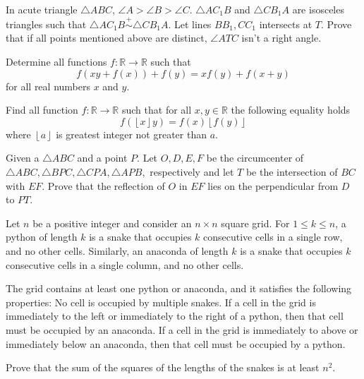 \documentclass[11pt]{scrartcl}
\begin{document}
\begin{problem}[8534263250311217423]
	In acute triangle $\triangle {ABC}$, $\angle 
A > \angle B > \angle C$. $\triangle {AC_1B}$ and $\triangle {CB_1A}$ are isosceles triangles such that $\triangle {AC_1B} \stackrel{+}{\sim}  \triangle {CB_1A}$. Let lines $BB_1, CC_1$ intersects at ${T}$. Prove that if all points mentioned above are distinct, $\angle ATC$ isn't a right angle.
\end{problem}
\begin{problem}[8540244741312291150]
Determine all functions $f:\mathbb{R} \to \mathbb{R}$ such that
\[ f(xy+f(x)) + f(y) = xf(y) + f(x+y) \]for all real numbers $x$ and $y$.
\end{problem}
\begin{problem}[8559783288978563338]
Find all function $f:\mathbb{R}\rightarrow\mathbb{R}$ such that for all $x,y\in\mathbb{R}$ the following equality holds\[
f(\left\lfloor x\right\rfloor y)=f(x)\left\lfloor f(y)\right\rfloor \]where $\left\lfloor a\right\rfloor $ is greatest integer not greater than $a.$
\end{problem}
\begin{problem}[8569243655022492300]
	Given a $ \triangle ABC $ and a point $ P. $ Let $ O, D, E, F $ be the circumcenter of $ \triangle ABC, \triangle BPC, \triangle CPA, \triangle APB, $ respectively and let $ T $ be the intersection of $ BC $ with $ EF. $ Prove that the reflection of $ O $ in $ EF $ lies on the perpendicular from $ D $ to $ PT. $
\end{problem}
\begin{problem}[8592236630142322398]
	Let \(n\) be a positive integer and consider an \(n\times n\) square grid. For \(1\le k\le n\), a python of length \(k\) is a snake that occupies \(k\) consecutive cells in a single row, and no other cells. Similarly, an anaconda of length \(k\) is a snake that occupies \(k\) consecutive cells in a single column, and no other cells.

The grid contains at least one python or anaconda, and it satisfies the following properties:
No cell is occupied by multiple snakes.
If a cell in the grid is immediately to the left or immediately to the right of a python, then that cell must be occupied by an anaconda.
If a cell in the grid is immediately to above or immediately below an anaconda, then that cell must be occupied by a python.

Prove that the sum of the squares of the lengths of the snakes is at least \(n^2\).
\end{problem}
\end{document}
